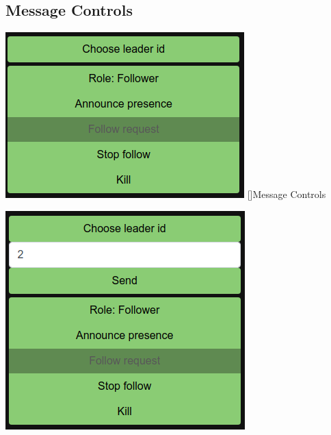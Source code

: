 \documentclass[12pt]{article}
\begin{document}
\subsection{Message Controls} \label{subsec:message controls}
\noindent
\begin{minipage}[t]{0.49\textwidth}
    \vspace{0pt} 
	\includegraphics[width=\linewidth]{Images/message_control_small.png}
	[]{Message Controls}
	\label{fig:message controls small}
\end{minipage}%
\hspace{0.02\textwidth} %
\begin{minipage}[t]{0.49\textwidth}
    \vspace{0pt}
   \includegraphics[width=\linewidth]{Images/message_control_full.png}
	\label{fig:message controls full}  
\end{minipage}%
\vspace{0.5cm} %
\end{document}
